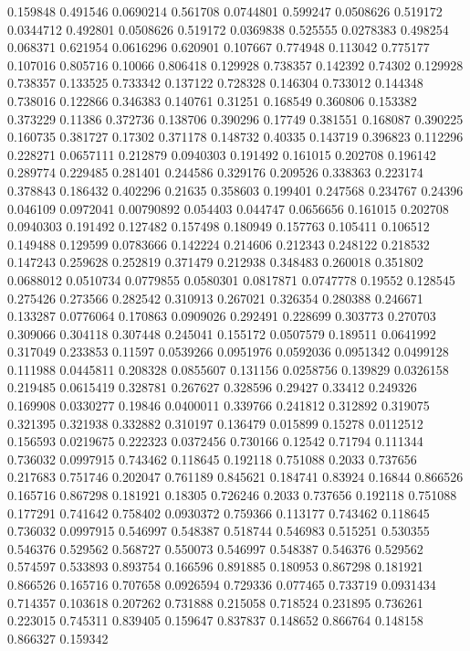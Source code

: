 0.159848 0.491546
0.0690214 0.561708
0.0744801 0.599247
0.0508626 0.519172
0.0344712 0.492801
0.0508626 0.519172
0.0369838 0.525555
0.0278383 0.498254
0.068371 0.621954
0.0616296 0.620901
0.107667 0.774948
0.113042 0.775177
0.107016 0.805716
0.10066 0.806418
0.129928 0.738357
0.142392 0.74302
0.129928 0.738357
0.133525 0.733342
0.137122 0.728328
0.146304 0.733012
0.144348 0.738016
0.122866 0.346383
0.140761 0.31251
0.168549 0.360806
0.153382 0.373229
0.11386 0.372736
0.138706 0.390296
0.17749 0.381551
0.168087 0.390225
0.160735 0.381727
0.17302 0.371178
0.148732 0.40335
0.143719 0.396823
0.112296 0.228271
0.0657111 0.212879
0.0940303 0.191492
0.161015 0.202708
0.196142 0.289774
0.229485 0.281401
0.244586 0.329176
0.209526 0.338363
0.223174 0.378843
0.186432 0.402296
0.21635 0.358603
0.199401 0.247568
0.234767 0.24396
0.046109 0.0972041
0.00790892 0.054403
0.044747 0.0656656
0.161015 0.202708
0.0940303 0.191492
0.127482 0.157498
0.180949 0.157763
0.105411 0.106512
0.149488 0.129599
0.0783666 0.142224
0.214606 0.212343
0.248122 0.218532
0.147243 0.259628
0.252819 0.371479
0.212938 0.348483
0.260018 0.351802
0.0688012 0.0510734
0.0779855 0.0580301
0.0817871 0.0747778
0.19552 0.128545
0.275426 0.273566
0.282542 0.310913
0.267021 0.326354
0.280388 0.246671
0.133287 0.0776064
0.170863 0.0909026
0.292491 0.228699
0.303773 0.270703
0.309066 0.304118
0.307448 0.245041
0.155172 0.0507579
0.189511 0.0641992
0.317049 0.233853
0.11597 0.0539266
0.0951976 0.0592036
0.0951342 0.0499128
0.111988 0.0445811
0.208328 0.0855607
0.131156 0.0258756
0.139829 0.0326158
0.219485 0.0615419
0.328781 0.267627
0.328596 0.29427
0.33412 0.249326
0.169908 0.0330277
0.19846 0.0400011
0.339766 0.241812
0.312892 0.319075
0.321395 0.321938
0.332882 0.310197
0.136479 0.015899
0.15278 0.0112512
0.156593 0.0219675
0.222323 0.0372456
0.730166 0.12542
0.71794 0.111344
0.736032 0.0997915
0.743462 0.118645
0.192118 0.751088
0.2033 0.737656
0.217683 0.751746
0.202047 0.761189
0.845621 0.184741
0.83924 0.16844
0.866526 0.165716
0.867298 0.181921
0.18305 0.726246
0.2033 0.737656
0.192118 0.751088
0.177291 0.741642
0.758402 0.0930372
0.759366 0.113177
0.743462 0.118645
0.736032 0.0997915
0.546997 0.548387
0.518744 0.546983
0.515251 0.530355
0.546376 0.529562
0.568727 0.550073
0.546997 0.548387
0.546376 0.529562
0.574597 0.533893
0.893754 0.166596
0.891885 0.180953
0.867298 0.181921
0.866526 0.165716
0.707658 0.0926594
0.729336 0.077465
0.733719 0.0931434
0.714357 0.103618
0.207262 0.731888
0.215058 0.718524
0.231895 0.736261
0.223015 0.745311
0.839405 0.159647
0.837837 0.148652
0.866764 0.148158
0.866327 0.159342
